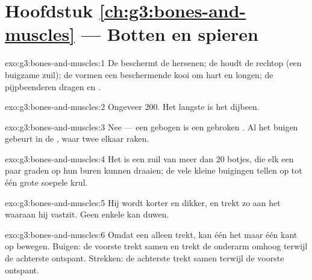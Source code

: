 \section*{Hoofdstuk \ref{ch:g3:bones-and-muscles} --- Botten en spieren}

\begin{solution}{exo:g3:bones-and-muscles:1}
De  beschermt de hersenen; de  houdt de  rechtop
(een buigzame zuil); de  vormen een beschermende kooi om hart en
longen; de pijpbeenderen dragen  en .
\end{solution}

\begin{solution}{exo:g3:bones-and-muscles:2}
Ongeveer $200$. Het langste is het dijbeen.
\end{solution}

\begin{solution}{exo:g3:bones-and-muscles:3}
Nee --- een gebogen  is een gebroken . Al het buigen gebeurt in
de , waar twee  elkaar raken.
\end{solution}

\begin{solution}{exo:g3:bones-and-muscles:4}
Het is een zuil van meer dan $20$ botjes, die elk een paar graden op
hun buren kunnen draaien; de vele kleine buigingen tellen op tot één
grote soepele krul.
\end{solution}

\begin{solution}{exo:g3:bones-and-muscles:5}
Hij wordt korter en dikker, en trekt zo aan het  waaraan hij
vastzit. Geen enkele  kan duwen.
\end{solution}

\begin{solution}{exo:g3:bones-and-muscles:6}
Omdat een  alleen trekt, kan één  het  maar één kant
op bewegen. Buigen: de voorste  trekt samen en trekt de onderarm
omhoog terwijl de achterste ontspant. Strekken: de achterste 
trekt samen terwijl de voorste ontspant.
\end{solution}

